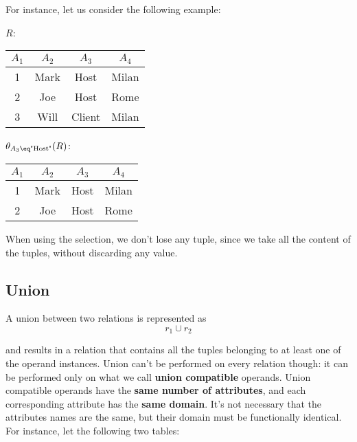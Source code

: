 For instance, let us consider the following example:
\begin{center}
    $R$: \quad \begin{tabular}{|c|c|c|c|}
        \hline \rowcolor{maindoccol!60}
        $A_1$ & $A_2$ & $A_3$ & $A_4$ \\
        \hline
        1 & Mark & Host & Milan \\
        \hline
        2 & Joe & Host & Rome \\
        \hline
        3 & Will & Client & Milan \\
        \hline
    \end{tabular}
    \quad $\theta_{A_3 \eq \text{"Host"}}(R)$: \quad \begin{tabular}{|c|c|c|c|}
        \hline \rowcolor{maindoccol!60}
        $A_1$ & $A_2$ & $A_3$ & $A_4$ \\
        \hline
        1 & Mark & Host & Milan \\
        \hline
        2 & Joe & Host & Rome \\
        \hline
    \end{tabular}
\end{center}

When using the selection, we don't lose any tuple, since we take all the content of the tuples, without discarding any value.

\subsection{Union}

A union between two relations is represented as
\[ r_1 \cup r_2 \]

and results in a relation that contains all the tuples belonging to at least one of the operand instances. Union can't be performed on every relation though: it can be performed only on what we call \textbf{union compatible} operands. Union compatible operands have the \textbf{same number of attributes}, and each corresponding attribute has the \textbf{same domain}. It's not necessary that the attributes names are the same, but their domain must be functionally identical.
For instance, let the following two tables:

